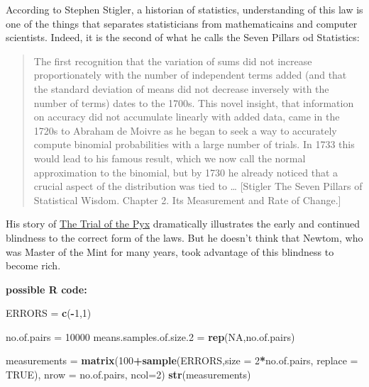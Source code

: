 \documentclass[]{book}
\newenvironment{Shaded}{\begin{snugshade}}{\end{snugshade}}
\newcommand{\DataTypeTok}[1]{\textcolor[rgb]{0.13,0.29,0.53}{#1}}
\newcommand{\DecValTok}[1]{\textcolor[rgb]{0.00,0.00,0.81}{#1}}
\newcommand{\FloatTok}[1]{\textcolor[rgb]{0.00,0.00,0.81}{#1}}
\newcommand{\KeywordTok}[1]{\textcolor[rgb]{0.13,0.29,0.53}{\textbf{#1}}}
\newcommand{\NormalTok}[1]{#1}
\newcommand{\OperatorTok}[1]{\textcolor[rgb]{0.81,0.36,0.00}{\textbf{#1}}}
\newcommand{\OtherTok}[1]{\textcolor[rgb]{0.56,0.35,0.01}{#1}}
\newcommand{\StringTok}[1]{\textcolor[rgb]{0.31,0.60,0.02}{#1}}
\begin{document}
According to Stephen Stigler, a historian of statistics, understanding of this law is one of the things that separates statisticians from mathematicains and computer scientists. Indeed, it is the second of what he calls the Seven Pillars od Statistics:

\begin{quote}
The first recognition that the variation of sums did not increase proportionately with the number of independent terms added (and that the standard deviation of means did not decrease inversely with the number of terms) dates to the 1700s. This novel insight, that information on accuracy did not accumulate linearly with added data, came in the 1720s to Abraham de Moivre as he began to seek a way to accurately compute binomial probabilities with a large number of trials. In 1733 this would lead to his famous result, which we now call the normal approximation to the binomial, but by 1730 he already noticed that a crucial aspect of the distribution was tied to \ldots{} {[}Stigler The Seven Pillars of Statistical Wisdom. Chapter 2. Its Measurement and Rate of Change.{]}
\end{quote}

His story of \href{http://www.biostat.mcgill.ca/hanley/c323/pyx.pdf}{The Trial of the Pyx} dramatically illustrates the early and continued blindness to the correct form of the laws. But he doesn't think that Newtom, who was Master of the Mint for many years, took advantage of this blindness to become rich.

\textbf{possible R code:}

\begin{Shaded}
\begin{Highlighting}[]
\NormalTok{ERRORS =}\StringTok{ }\KeywordTok{c}\NormalTok{(}\OperatorTok{-}\DecValTok{1}\NormalTok{,}\DecValTok{1}\NormalTok{)}

\NormalTok{no.of.pairs =}\StringTok{ }\DecValTok{10000} 
\NormalTok{means.samples.of.size}\FloatTok{.2}\NormalTok{ =}\StringTok{ }\KeywordTok{rep}\NormalTok{(}\OtherTok{NA}\NormalTok{,no.of.pairs)}

\NormalTok{measurements =}\StringTok{ }\KeywordTok{matrix}\NormalTok{(}\DecValTok{100}\OperatorTok{+}\KeywordTok{sample}\NormalTok{(ERRORS,}\DataTypeTok{size =} \DecValTok{2}\OperatorTok{*}\NormalTok{no.of.pairs, }\DataTypeTok{replace =} \OtherTok{TRUE}\NormalTok{),}
                      \DataTypeTok{nrow =}\NormalTok{ no.of.pairs, }\DataTypeTok{ncol=}\DecValTok{2}\NormalTok{)}
\KeywordTok{str}\NormalTok{(measurements)}
\end{Highlighting}
\end{Shaded}
\end{document}
